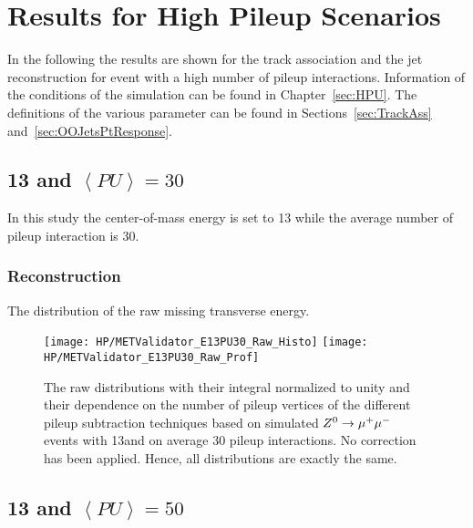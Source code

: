 \chapter{Results for High Pileup Scenarios \label{sec:HPUApp}}

In the following the results are shown for the track association and the jet reconstruction for event with a high number of pileup interactions. Information of the conditions of the simulation can be found in Chapter~\ref{sec:HPU}. The definitions of the various parameter can be found in Sections~\ref{sec:TrackAss} and~\ref{sec:OOJetsPtResponse}.

\section{\texorpdfstring{13\TeV{}}{13 TeV} and \texorpdfstring{$\left<PU\right>=30$}{<PU>=30}}

In this study the center-of-mass energy is set to 13\TeV{} while the average number of pileup interaction is 30. 

\subsection{\texorpdfstring{\MET{}}{MET} Reconstruction  \label{sec:HPUAppE13PU30MC}}

The distribution of the raw missing transverse energy. 

\begin{figure}[h!t]
  \centering
  \texttt{[image: HP/METValidator\_E13PU30\_Raw\_Histo]}
  \texttt{[image: HP/METValidator\_E13PU30\_Raw\_Prof]}
  \caption[The raw \MET{} distributions and their dependence on the number of pileup vertices of different pileup subtraction techniques based on simulated  $\Zz\rightarrow\MM$ events with 13\TeV and $\left<PU\right>=30$]{The raw \MET{} distributions with their integral normalized to unity and their dependence on the number of pileup vertices of the different pileup subtraction techniques based on simulated  $\Zz\rightarrow\MM$ events with 13\TeV and on average 30 pileup interactions. No correction has been applied. Hence, all distributions are exactly the same.}
\end{figure}

\section{\texorpdfstring{13\TeV{}}{13 TeV} and \texorpdfstring{$\left<PU\right>=50$}{<PU>=50}}

